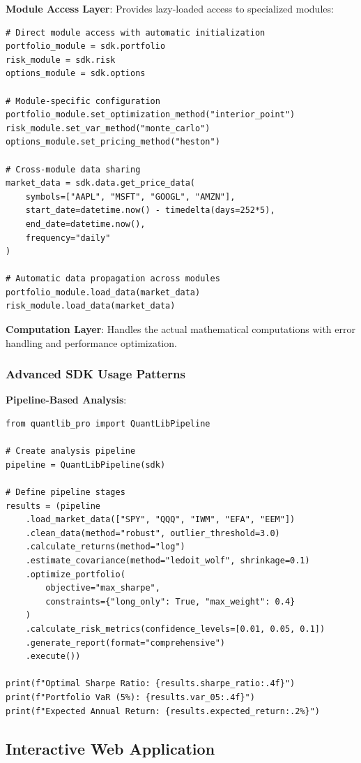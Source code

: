\documentclass[12pt,a4paper]{article}
\theoremstyle{definition}
\theoremstyle{remark}
\begin{document}
\textbf{Module Access Layer}: Provides lazy-loaded access to specialized modules:
\begin{lstlisting}[caption=Module Access Patterns]
# Direct module access with automatic initialization
portfolio_module = sdk.portfolio
risk_module = sdk.risk
options_module = sdk.options

# Module-specific configuration
portfolio_module.set_optimization_method("interior_point")
risk_module.set_var_method("monte_carlo")
options_module.set_pricing_method("heston")

# Cross-module data sharing
market_data = sdk.data.get_price_data(
    symbols=["AAPL", "MSFT", "GOOGL", "AMZN"],
    start_date=datetime.now() - timedelta(days=252*5),
    end_date=datetime.now(),
    frequency="daily"
)

# Automatic data propagation across modules
portfolio_module.load_data(market_data)
risk_module.load_data(market_data)
\end{lstlisting}

\textbf{Computation Layer}: Handles the actual mathematical computations with error handling and performance optimization.

\subsubsection{Advanced SDK Usage Patterns}

\textbf{Pipeline-Based Analysis}:
\begin{lstlisting}[caption=Advanced Pipeline Analysis]
from quantlib_pro import QuantLibPipeline

# Create analysis pipeline
pipeline = QuantLibPipeline(sdk)

# Define pipeline stages
results = (pipeline
    .load_market_data(["SPY", "QQQ", "IWM", "EFA", "EEM"])
    .clean_data(method="robust", outlier_threshold=3.0)
    .calculate_returns(method="log")
    .estimate_covariance(method="ledoit_wolf", shrinkage=0.1)
    .optimize_portfolio(
        objective="max_sharpe",
        constraints={"long_only": True, "max_weight": 0.4}
    )
    .calculate_risk_metrics(confidence_levels=[0.01, 0.05, 0.1])
    .generate_report(format="comprehensive")
    .execute())

print(f"Optimal Sharpe Ratio: {results.sharpe_ratio:.4f}")
print(f"Portfolio VaR (5%): {results.var_05:.4f}")
print(f"Expected Annual Return: {results.expected_return:.2%}")
\end{lstlisting}

\subsection{Interactive Web Application}
\end{document}
